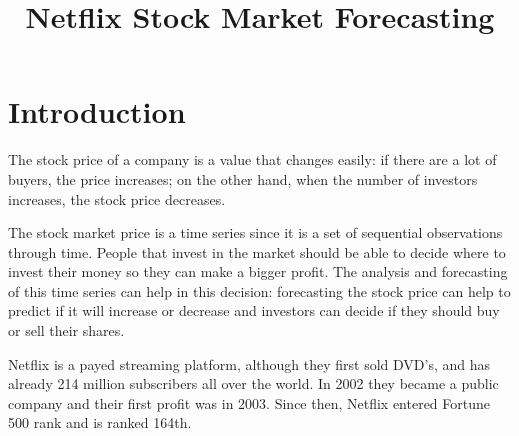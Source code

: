 \documentclass[conference]{IEEEtran}
\begin{document}
\title{Netflix Stock Market Forecasting\\
}

\author{
\and
{}
}

\maketitle

\begin{abstract}
\end{abstract}

\begin{IEEEkeywords}

\end{IEEEkeywords}

\section{Introduction}

The stock price of a company is a value that changes easily: if there are a lot of buyers, the price increases; on the other hand, when the number of investors increases, the stock price decreases.

The stock market price is a time series since it is a set of sequential observations through time. People that invest in the market should be able to decide where to invest their money so they can make a bigger profit\cite{r1}. The analysis and forecasting of this time series can help in this decision: forecasting the stock price can help to predict if it will increase or decrease and investors can decide if they should buy or sell their shares.

Netflix is a payed streaming platform, although they first sold DVD's, and has already 214 million subscribers all over the world. In 2002 they became a public company and their first profit was in 2003. Since then, Netflix entered Fortune 500 rank and is ranked 164th.
\end{document}
